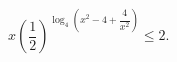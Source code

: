 \begin{ex}[type=inequality]
	\begin{condition}
		$  x\left(\dfrac{1}{2}\right)^{\log_4\left(x^2 - 4 + \dfrac{4}{x^2}\right)}\leqslant2.$
	\end{condition}
\end{ex}